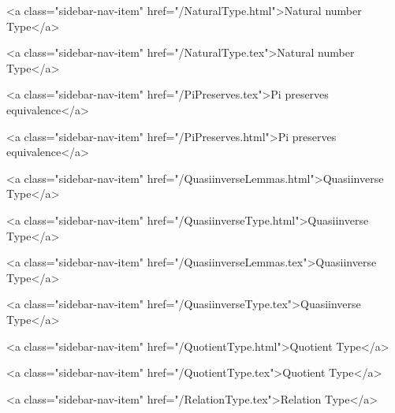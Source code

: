       
        
          <a class="sidebar-nav-item" href="/NaturalType.html">Natural number Type</a>
        
      
    
      
        
          <a class="sidebar-nav-item" href="/NaturalType.tex">Natural number Type</a>
        
      
    
      
        
          <a class="sidebar-nav-item" href="/PiPreserves.tex">Pi preserves equivalence</a>
        
      
    
      
        
          <a class="sidebar-nav-item" href="/PiPreserves.html">Pi preserves equivalence</a>
        
      
    
      
        
          <a class="sidebar-nav-item" href="/QuasiinverseLemmas.html">Quasiinverse Type</a>
        
      
    
      
        
          <a class="sidebar-nav-item" href="/QuasiinverseType.html">Quasiinverse Type</a>
        
      
    
      
        
          <a class="sidebar-nav-item" href="/QuasiinverseLemmas.tex">Quasiinverse Type</a>
        
      
    
      
        
          <a class="sidebar-nav-item" href="/QuasiinverseType.tex">Quasiinverse Type</a>
        
      
    
      
        
          <a class="sidebar-nav-item" href="/QuotientType.html">Quotient Type</a>
        
      
    
      
        
          <a class="sidebar-nav-item" href="/QuotientType.tex">Quotient Type</a>
        
      
    
      
        
          <a class="sidebar-nav-item" href="/RelationType.tex">Relation Type</a>
        
